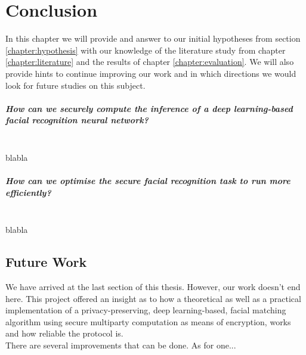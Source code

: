 \chapter{Conclusion}
In this chapter we will provide and answer to our initial hypotheses from section \ref{chapter:hypothesis} with our knowledge of the literature study from chapter \ref{chapter:literature} and the results of chapter \ref{chapter:evaluation}. We will also provide hints to continue improving our work and in which directions we would look for future studies on this subject.

\paragraph{How can we securely compute the inference of a deep learning-based facial recognition neural network?}\mbox{} \\
blabla
\paragraph{How can we optimise the secure facial recognition task to run more efficiently?}\mbox{}
\\
blabla

\section{Future Work}
We have arrived at the last section of this thesis. However, our work doesn't end here. This project offered an insight as to how a theoretical as well as a practical implementation of a privacy-preserving, deep learning-based, facial matching algorithm using secure multiparty computation as means of encryption, works and how reliable the protocol is.\\

There are several improvements that can be done. As for one...

